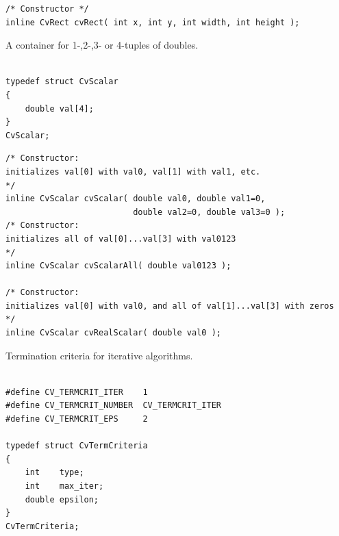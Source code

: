 \begin{description}
\end{description}

\begin{lstlisting}
/* Constructor */
inline CvRect cvRect( int x, int y, int width, int height );

\end{lstlisting}

\label{CvScalar}

A container for 1-,2-,3- or 4-tuples of doubles.

\begin{lstlisting}

typedef struct CvScalar
{
    double val[4];
}
CvScalar;

\end{lstlisting}

\begin{lstlisting}
/* Constructor: 
initializes val[0] with val0, val[1] with val1, etc. 
*/
inline CvScalar cvScalar( double val0, double val1=0,
                          double val2=0, double val3=0 );
/* Constructor: 
initializes all of val[0]...val[3] with val0123 
*/
inline CvScalar cvScalarAll( double val0123 );

/* Constructor: 
initializes val[0] with val0, and all of val[1]...val[3] with zeros 
*/
inline CvScalar cvRealScalar( double val0 );

\end{lstlisting}

\label{CvTermCriteria}

Termination criteria for iterative algorithms.

\begin{lstlisting}

#define CV_TERMCRIT_ITER    1
#define CV_TERMCRIT_NUMBER  CV_TERMCRIT_ITER
#define CV_TERMCRIT_EPS     2

typedef struct CvTermCriteria
{
    int    type;
    int    max_iter; 
    double epsilon; 
}
CvTermCriteria;
\end{lstlisting}

\begin{description}
\end{description}

